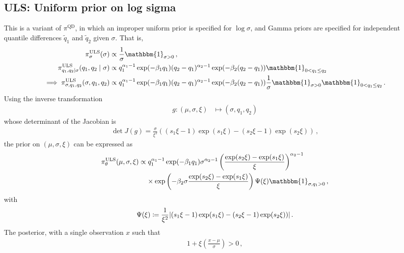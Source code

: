 \documentclass{article}
\DeclarePairedDelimiter\abs{\lvert}{\rvert}
\begin{document}
\subsection{ULS: Uniform prior on log sigma}
%

%
This is a variant of $\pi^{\text{QD}}$,
in which an improper uniform prior is specified for $\log \sigma$,
and Gamma priors are specified for independent quantile differences
$\tilde{q}_1$ and $\tilde{q}_2$ given $\sigma$. That is,
%
\begin{align*}
	\pi^{\text{ULS}}_{\sigma}(\sigma)
		&\propto \frac{1}{\sigma} \mathbbm{1}_{\sigma > 0} \,,\\
	\pi^{\text{ULS}}_{q_1, q_2 \mid \sigma}(q_{1}, q_{2} \mid \sigma)
		&\propto q_{1} ^ {\alpha_1 - 1} \exp(-\beta_1 q_{1})
		(q_{2} - q_{1}) ^ {\alpha_2 - 1} \exp(-\beta_2 (q_2 - q_{1}))
		\mathbbm{1}_{0 <q_1 \leq q_2}\\
	\implies \pi^{\text{ULS}}_{\sigma, q_1, q_2}(\sigma, q_1, q_2)
		&\propto q_{1} ^ {\alpha_1 - 1} \exp(-\beta_1 q_{1})
		(q_{2} - q_{1}) ^ {\alpha_2 - 1} \exp(-\beta_2(q_2 - q_{1}))
		\frac{1}{\sigma} \mathbbm{1}_{\sigma > 0}
		\mathbbm{1}_{0 < q_1 \leq q_2} \,.
\end{align*}
%
Using the inverse transformation
%
\begin{align*}
	g \colon (\mu, \sigma, \xi) &\mapsto (\sigma, q_{1}, q_{2})
\end{align*}
%
whose determinant of the Jacobian is
%
\begin{align*}
	\det J(g) = \frac{\sigma}{\xi ^ {2} }
		((s_1 \xi - 1) \exp(s_1 \xi) - (s_2 \xi - 1) \exp(s_2 \xi)) \,,
\end{align*}
%
the prior on $(\mu, \sigma, \xi)$ can be expressed as
%
\begin{align*}
	\pi^{\text{ULS}}_\theta(\mu, \sigma, \xi)
		&\propto q_{1} ^ {\alpha_1 - 1} \exp(-\beta_1 q_{1})
		\sigma ^ {\alpha_2 - 1} \left(\frac{\exp(s_{2} \xi)
		- \exp(s_{1} \xi)} {\xi}\right) ^ {\alpha_2 - 1}\\
	&\ \phantom{=} \times \exp\left(-\beta_2 \sigma \frac{\exp(s_{2} \xi)
		- \exp(s_{1} \xi)}{\xi}\right) \Psi(\xi)
		\mathbbm{1}_{\sigma, q_1 > 0} \,,
\end{align*}
%
with
%
\begin{align*}
	\Psi(\xi) \coloneqq \frac{1}{\xi ^ {2}} \abs{(s_1 \xi - 1) \exp(s_1 \xi)
		- (s_2 \xi - 1) \exp(s_2 \xi))} \,.
\end{align*}
%
The posterior, with a single observation $x$ such that
%
\begin{align*}
1 + \xi \left(\frac{x - \mu}{\sigma}\right) > 0 \,,
\end{align*}
\end{document}
